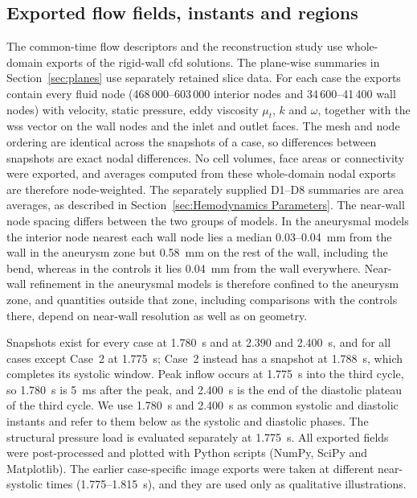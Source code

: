 \documentclass[12pt,a4paper]{article}
\newcommand{\cfdrevision}[1]{#1} %
\newcommand{\CFD}{\ac{cfd}\xspace}
\newcommand{\WSS}{\ac{wss}\xspace}
\theoremstyle{definition}
\numberwithin{equation}{section}
\providecommand{\DIFaddtex}[1]{{\protect\color{blue} \sf #1}} %
\providecommand{\DIFdeltex}[1]{{\protect\color{red} \scriptsize #1}} %
\providecommand{\DIFaddbegin}{} %
\providecommand{\DIFaddend}{} %
\providecommand{\DIFdelbegin}{} %
\providecommand{\DIFdelend}{} %
\providecommand{\DIFadd}[1]{\texorpdfstring{\DIFaddtex{#1}}{#1}} %
\providecommand{\DIFdel}[1]{\texorpdfstring{\DIFdeltex{#1}}{}} %
\newcommand{\DIFscaledelfig}{0.5}
\newlength{\DIFdelgraphicswidth} %
\newlength{\DIFdelgraphicsheight} %
\newcommand{\DIFaddincludegraphics}[2][]{{\color{blue}\fbox{\DIFOincludegraphics[#1]{#2}}}} %
\newcommand{\DIFdelincludegraphics}[2][]{%
\sbox{\DIFdelgraphicsbox}{\DIFOincludegraphics[#1]{#2}}%
\settoboxwidth{\DIFdelgraphicswidth}{\DIFdelgraphicsbox} %
\settoboxtotalheight{\DIFdelgraphicsheight}{\DIFdelgraphicsbox} %
\scalebox{\DIFscaledelfig}{%
\parbox[b]{\DIFdelgraphicswidth}{\usebox{\DIFdelgraphicsbox}\\[-\baselineskip] \rule{\DIFdelgraphicswidth}{0em}}\llap{\resizebox{\DIFdelgraphicswidth}{\DIFdelgraphicsheight}{%
\setlength{\unitlength}{\DIFdelgraphicswidth}%
\begin{picture}(1,1)%
\thicklines\linethickness{2pt} %
{\color[rgb]{1,0,0}\put(0,0){\framebox(1,1){}}}%
{\color[rgb]{1,0,0}\put(0,0){\line( 1,1){1}}}%
{\color[rgb]{1,0,0}\put(0,1){\line(1,-1){1}}}%
\end{picture}%
}\hspace*{3pt}}} %
} %
\DeclareRobustCommand{\DIFaddbegin}{\DIFOaddbegin \let\includegraphics\DIFaddincludegraphics} %
\DeclareRobustCommand{\DIFaddend}{\DIFOaddend \let\includegraphics\DIFOincludegraphics} %
\DeclareRobustCommand{\DIFdelbegin}{\DIFOdelbegin \let\includegraphics\DIFdelincludegraphics} %
\DeclareRobustCommand{\DIFdelend}{\DIFOaddend \let\includegraphics\DIFOincludegraphics} %
\renewcommand{\DIFaddtex}[1]{{\protect\color{red}#1}}
\renewcommand{\DIFdeltex}[1]{}
\renewcommand{\DIFdel}[1]{}
\renewcommand{\DIFaddincludegraphics}[2][]{\DIFOincludegraphics[#1]{#2}}
\renewcommand{\DIFdelincludegraphics}[2][]{}
\renewcommand{\cfdrevision}[1]{\textcolor{red}{#1}}
\def\DIFaddbegin{}\def\DIFaddend{}%
\def\DIFdelbegin{}\def\DIFdelend{}%
\def\cfdrevision#1{#1}%
\begin{document}
\subsection{Exported flow fields, instants and regions}
\label{sec:exports}
\DIFdelbegin \DIFdel{All quantitative flow results in this paper, including }\DIFdelend \DIFaddbegin \DIFadd{The common-time flow descriptors and }\DIFaddend the reconstruction study \DIFdelbegin \DIFdel{, }\DIFdelend use whole-domain exports of the rigid-wall \CFD solutions. \DIFaddbegin \DIFadd{The plane-wise summaries in Section~\ref{sec:planes} use separately retained slice data. }\DIFaddend For each case the exports contain every fluid node (468\,000--603\,000 interior nodes and 34\,600--41\,400 wall nodes) with velocity, static pressure, eddy viscosity $\mu_t$, $k$ and $\omega$, together with the \WSS vector on the wall nodes and the inlet and outlet faces. The mesh and node ordering are identical across the snapshots of a case, so differences between snapshots are exact nodal differences. No cell volumes, face areas or connectivity were exported, and \DIFdelbegin \DIFdel{all averages }\DIFdelend \DIFaddbegin \DIFadd{\cfdrevision{averages computed from these whole-domain nodal exports} }\DIFaddend are therefore node-weighted. \DIFaddbegin \DIFadd{\cfdrevision{The separately supplied D1--D8 summaries are area averages, as described in Section~\ref{sec:Hemodynamics Parameters}.} }\DIFaddend The near-wall node spacing differs between the two groups of models. In the aneurysmal models the interior node nearest each wall node lies a median 0.03--0.04~mm from the wall in the aneurysm zone but 0.58~mm on the rest of the wall, including the bend, whereas in the controls it lies 0.04~mm from the wall everywhere. Near-wall refinement in the aneurysmal models is therefore confined to the aneurysm zone, and quantities outside that zone, including comparisons with the controls there, depend on near-wall resolution as well as on geometry.

Snapshots exist for every case at 1.780~s and at 2.390 and 2.400~s, and for all cases except Case~2 at 1.775~s; Case~2 instead has a snapshot at 1.788~s, which completes its systolic window. Peak inflow occurs at 1.775~s into the third cycle, so 1.780~s is 5~ms after the peak, and 2.400~s is the end of the diastolic plateau of the third cycle. We use 1.780~s and 2.400~s as common systolic and diastolic instants and refer to them below as the systolic and diastolic phases. \DIFaddbegin \DIFadd{\cfdrevision{The structural pressure load is evaluated separately at 1.775~s.} }\DIFaddend All exported fields were post-processed and plotted with Python scripts (NumPy, SciPy and Matplotlib). The earlier case-specific image exports were taken at different near-systolic times (1.775--1.815~s), and they are used only as qualitative illustrations.
\end{document}
